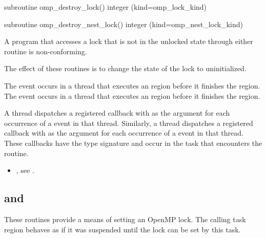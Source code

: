 \begin{fortranspecific}
\begin{ompfSubroutine}
subroutine omp_destroy_lock()
integer (kind=omp_lock_kind) 

subroutine omp_destroy_nest_lock()
integer (kind=omp_nest_lock_kind) 
\end{ompfSubroutine}
\end{fortranspecific}

\constraints
A program that accesses a lock that is not in the unlocked state 
through either routine is non-conforming.

\effect
The effect of these routines is to change the state of the lock to uninitialized.

\events
The  event occurs in a thread that executes an 
 region before it finishes the region. The 
 event occurs in a thread that 
executes an  region before it finishes the region.

\tools
A thread dispatches a registered  
callback with  as the  argument for each 
occurrence of a  event in that thread. Similarly, 
a thread dispatches a registered  
callback with  as the  argument for each 
occurrence of a  event in that thread. These 
callbacks have the type signature 
and occur in the task that encounters the routine.

\crossreferences
\begin{itemize}
\item {}, see
.
\end{itemize}



\subsection{ and }
\label{subsec:omp_set_lock and omp_set_nest_lock}
\summary
These routines provide a means of setting an OpenMP lock. The calling
task region behaves as if it was suspended until the lock can be set
by this task.

